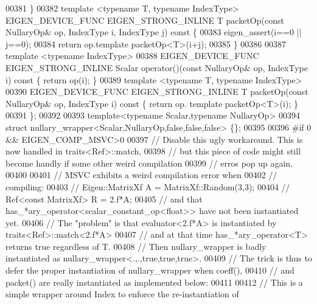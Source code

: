\begin{DoxyCode}
00381   \}
00382   \textcolor{keyword}{template} <\textcolor{keyword}{typename} T, \textcolor{keyword}{typename} IndexType> EIGEN\_DEVICE\_FUNC EIGEN\_STRONG\_INLINE T packetOp(\textcolor{keyword}{const} 
      NullaryOp& op, IndexType i, IndexType j)\textcolor{keyword}{ const }\{
00383     eigen\_assert(i==0 || j==0);
00384     \textcolor{keywordflow}{return} op.template packetOp<T>(i+j);
00385   \}
00386 
00387   \textcolor{keyword}{template} <\textcolor{keyword}{typename} IndexType>
00388   EIGEN\_DEVICE\_FUNC EIGEN\_STRONG\_INLINE Scalar operator()(\textcolor{keyword}{const} NullaryOp& op, IndexType i)\textcolor{keyword}{ const }\{ \textcolor{keywordflow}{return} 
      op(i); \}
00389   \textcolor{keyword}{template} <\textcolor{keyword}{typename} T, \textcolor{keyword}{typename} IndexType>
00390   EIGEN\_DEVICE\_FUNC EIGEN\_STRONG\_INLINE T packetOp(\textcolor{keyword}{const} NullaryOp& op, IndexType i)\textcolor{keyword}{ const }\{ \textcolor{keywordflow}{return} op.
      template packetOp<T>(i); \}
00391 \};
00392 
00393 \textcolor{keyword}{template}<\textcolor{keyword}{typename} Scalar,\textcolor{keyword}{typename} NullaryOp>
00394 \textcolor{keyword}{struct }nullary\_wrapper<Scalar,NullaryOp,false,false,false> \{\};
00395 
00396 \textcolor{preprocessor}{#if 0 && EIGEN\_COMP\_MSVC>0}
00397 \textcolor{comment}{// Disable this ugly workaround. This is now handled in traits<Ref>::match,}
00398 \textcolor{comment}{// but this piece of code might still become handly if some other weird compilation}
00399 \textcolor{comment}{// erros pop up again.}
00400 
00401 \textcolor{comment}{// MSVC exhibits a weird compilation error when}
00402 \textcolor{comment}{// compiling:}
00403 \textcolor{comment}{//    Eigen::MatrixXf A = MatrixXf::Random(3,3);}
00404 \textcolor{comment}{//    Ref<const MatrixXf> R = 2.f*A;}
00405 \textcolor{comment}{// and that has\_*ary\_operator<scalar\_constant\_op<float>> have not been instantiated yet.}
00406 \textcolor{comment}{// The "problem" is that evaluator<2.f*A> is instantiated by traits<Ref>::match<2.f*A>}
00407 \textcolor{comment}{// and at that time has\_*ary\_operator<T> returns true regardless of T.}
00408 \textcolor{comment}{// Then nullary\_wrapper is badly instantiated as nullary\_wrapper<.,.,true,true,true>.}
00409 \textcolor{comment}{// The trick is thus to defer the proper instantiation of nullary\_wrapper when coeff(),}
00410 \textcolor{comment}{// and packet() are really instantiated as implemented below:}
00411 
00412 \textcolor{comment}{// This is a simple wrapper around Index to enforce the re-instantiation of}

\end{DoxyCode}
